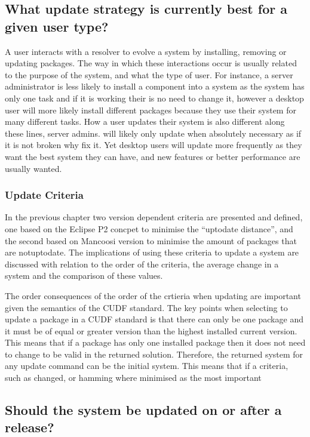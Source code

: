 \subsection{What update strategy is currently best for a given user type?}
A user interacts with a resolver to evolve a system by installing, removing or updating packages.
The way in which these interactions occur is usually related to the purpose of the system, and what the type of user.
For instance, a server administrator is less likely to install a component into a system as the system has only one task and if it is working their is no need to change it, 
however a desktop user will more likely install different packages because they use their system for many different tasks.
How a user updates their system is also different along these lines, server admins. will likely only update when absolutely necessary as if it is not broken why fix it.
Yet desktop users will update more frequently as they want the best system they can have, and new features or better performance are usually wanted.


\subsubsection{Update Criteria}
{}In the previous chapter two version dependent criteria are presented and defined, one based on the Eclipse P2 concpet to minimise the ``uptodate distance'', 
{}and the second based on Mancoosi version to minimise the amount of packages that are notuptodate. 
{}The implications of using these criteria to update a system are discussed with relation to the order of the criteria, the average change in a system and the comparison of these values.

The order consequences of the order of the crtieria when updating are important given the semantics of the CUDF standard.
The key points when selecting to update a package in a CUDF standard is that there can only be one package and it must be of equal or greater version than the highest installed current version.
This means that if a package has only one installed package then it does not need to change to be valid in the returned solution.
Therefore, the returned system for any update command can be the initial system.
This means that if a criteria, such as changed, or hamming where minimised as the most important  


\subsection{Should the system be updated on or after a release?}

